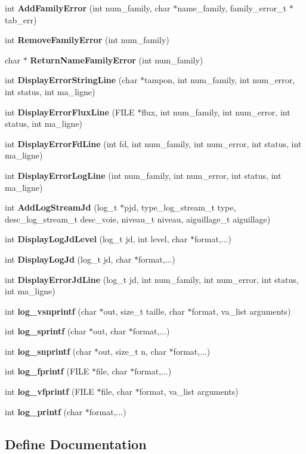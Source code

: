 \begin{CompactItemize}
\item 
int {\bf Add\-Family\-Error} (int num\_\-family, char $\ast$name\_\-family, family\_\-error\_\-t $\ast$tab\_\-err)
\item 
int {\bf Remove\-Family\-Error} (int num\_\-family)
\item 
char $\ast$ {\bf Return\-Name\-Family\-Error} (int num\_\-family)
\item 
int {\bf Display\-Error\-String\-Line} (char $\ast$tampon, int num\_\-family, int num\_\-error, int status, int ma\_\-ligne)
\item 
int {\bf Display\-Error\-Flux\-Line} (FILE $\ast$flux, int num\_\-family, int num\_\-error, int status, int ma\_\-ligne)
\item 
int {\bf Display\-Error\-Fd\-Line} (int fd, int num\_\-family, int num\_\-error, int status, int ma\_\-ligne)
\item 
int {\bf Display\-Error\-Log\-Line} (int num\_\-family, int num\_\-error, int status, int ma\_\-ligne)
\item 
int {\bf Add\-Log\-Stream\-Jd} (log\_\-t $\ast$pjd, type\_\-log\_\-stream\_\-t type, desc\_\-log\_\-stream\_\-t desc\_\-voie, niveau\_\-t niveau, aiguillage\_\-t aiguillage)
\item 
int {\bf Display\-Log\-Jd\-Level} (log\_\-t jd, int level, char $\ast$format,...)
\item 
int {\bf Display\-Log\-Jd} (log\_\-t jd, char $\ast$format,...)
\item 
int {\bf Display\-Error\-Jd\-Line} (log\_\-t jd, int num\_\-family, int num\_\-error, int status, int ma\_\-ligne)
\item 
int {\bf log\_\-vsnprintf} (char $\ast$out, size\_\-t taille, char $\ast$format, va\_\-list arguments)
\item 
int {\bf log\_\-sprintf} (char $\ast$out, char $\ast$format,...)
\item 
int {\bf log\_\-snprintf} (char $\ast$out, size\_\-t n, char $\ast$format,...)
\item 
int {\bf log\_\-fprintf} (FILE $\ast$file, char $\ast$format,...)
\item 
int {\bf log\_\-vfprintf} (FILE $\ast$file, char $\ast$format, va\_\-list arguments)
\item 
int {\bf log\_\-printf} (char $\ast$format,...)
\end{CompactItemize}


\subsection{Define Documentation}
